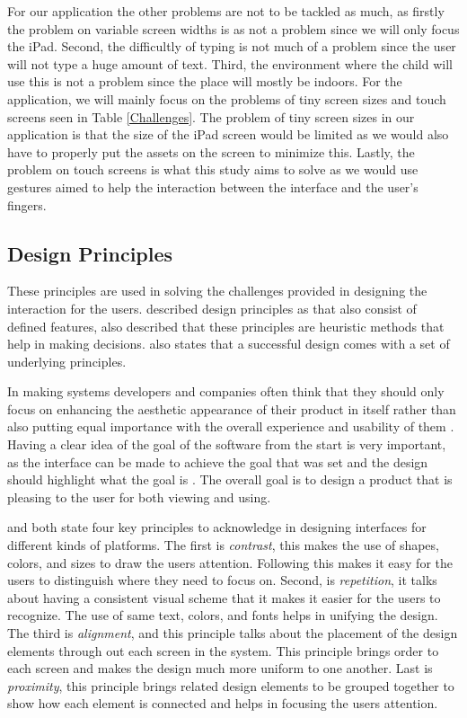 For our application the other problems are not to be tackled as much, as firstly the problem on variable screen widths is as not a problem since we will only focus the iPad. Second, the difficultly of typing is not much of a problem since the user will not type a huge amount of text. Third, the environment where the child will use this is not a problem since the place will mostly be indoors. For the application, we will mainly focus on the problems of tiny screen sizes and touch screens seen in Table \ref{Challenges}. The problem of tiny screen sizes in our application is that the size of the iPad screen would be limited as we would also have to properly put the assets on the screen to minimize this. Lastly, the problem on touch screens is what this study aims to solve as we would use gestures aimed to help the interaction between the interface and the user's fingers.

\subsection{Design Principles}
These principles are used in solving the challenges provided in designing the interaction for the users.  described design principles as  that also consist of defined features,  also described that these principles are heuristic methods that help in making decisions.  also states that a successful design comes with a set of underlying principles.  

In making systems developers and companies often think that they should only focus on enhancing the aesthetic appearance of their product in itself rather than also putting equal importance with the overall experience and usability of them \cite{norman1999affordance,blasing2010android,stephanidis2012encyclopedia}. Having a clear idea of the goal of the software from the start is very important, as the interface can be made to achieve the goal that was set and the design should highlight what the goal is \cite{blair2008user}. The overall goal is to design a product that is pleasing to the user for both viewing and using.

 and  both state four key principles to acknowledge in designing interfaces for different kinds of platforms. The first is \textit{contrast}, this makes the use of shapes, colors, and sizes to draw the users attention. Following this makes it easy for the users to distinguish where they need to focus on. Second, is \textit{repetition}, it talks about having a consistent visual scheme that it makes it easier for the users to recognize. The use of same text, colors, and fonts helps in unifying the design. The third is \textit{alignment}, and this principle talks about the placement of the design elements through out each screen in the system. This principle brings order to each screen and makes the design much more uniform to one another. Last is \textit{proximity}, this principle brings related design elements to be grouped together to show how each element is connected and helps in focusing the users attention. 

